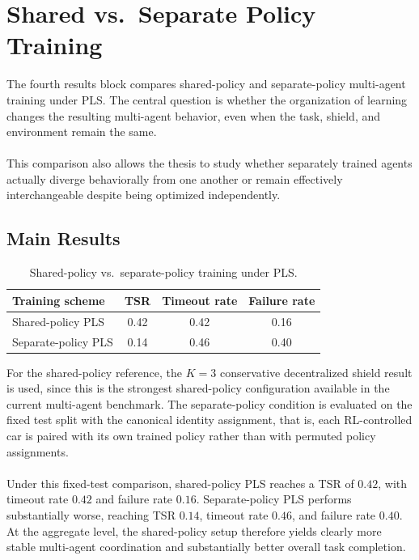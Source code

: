 \section{Shared vs.\ Separate Policy Training}
\label{sec:results-rq4}

The fourth results block compares shared-policy and separate-policy multi-agent training under PLS. The central question is whether the organization of learning changes the resulting multi-agent behavior, even when the task, shield, and environment remain the same.
\\
\\
This comparison also allows the thesis to study whether separately trained agents actually diverge behaviorally from one another or remain effectively interchangeable despite being optimized independently.

\subsection{Main Results}
\begin{table}[H]
\centering
\caption{Shared-policy vs.\ separate-policy training under PLS.}
\label{tab:results-rq4-main}
\begin{tabular}{lccc}
\toprule
\textbf{Training scheme} & \textbf{TSR} & \textbf{Timeout rate} & \textbf{Failure rate} \\
\midrule
Shared-policy PLS & 0.42 & 0.42 & 0.16 \\
Separate-policy PLS & 0.14 & 0.46 & 0.40 \\
\bottomrule
\end{tabular}
\end{table}

For the shared-policy reference, the \(K=3\) conservative decentralized shield result is used, since this is the strongest shared-policy configuration available in the current multi-agent benchmark. The separate-policy condition is evaluated on the fixed test split with the canonical identity assignment, that is, each RL-controlled car is paired with its own trained policy rather than with permuted policy assignments.
\\
\\
Under this fixed-test comparison, shared-policy PLS reaches a TSR of \(0.42\), with timeout rate \(0.42\) and failure rate \(0.16\). Separate-policy PLS performs substantially worse, reaching TSR \(0.14\), timeout rate \(0.46\), and failure rate \(0.40\). At the aggregate level, the shared-policy setup therefore yields clearly more stable multi-agent coordination and substantially better overall task completion.

